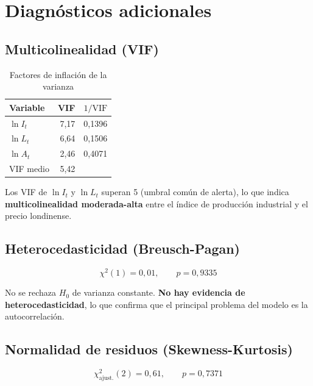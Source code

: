 \documentclass[12pt,a4paper]{article}
\begin{document}
\section*{Diagnósticos adicionales}

\subsection*{Multicolinealidad (VIF)}

\begin{table}[H]
  \centering
  \caption{Factores de inflación de la varianza}
  \label{tab:vif}
  \begin{tabular}{lrr}
    \toprule
    Variable & VIF & $1/\text{VIF}$ \\
    \midrule
    $\ln I_t$ & 7{,}17 & 0{,}1396 \\
    $\ln L_t$ & 6{,}64 & 0{,}1506 \\
    $\ln A_t$ & 2{,}46 & 0{,}4071 \\
    \midrule
    VIF medio & 5{,}42 & \\
    \bottomrule
  \end{tabular}
\end{table}

Los VIF de $\ln I_t$ y $\ln L_t$ superan 5 (umbral común de alerta),
lo que indica \textbf{multicolinealidad moderada-alta} entre el índice de
producción industrial y el precio londinense.

\subsection*{Heterocedasticidad (Breusch-Pagan)}

\[
  \chi^2(1) = 0{,}01, \qquad p = 0{,}9335
\]

No se rechaza $H_0$ de varianza constante. \textbf{No hay evidencia de
heterocedasticidad}, lo que confirma que el principal problema del modelo
es la autocorrelación.

\subsection*{Normalidad de residuos (Skewness-Kurtosis)}

\[
  \chi^2_{\text{ajust.}}(2) = 0{,}61, \qquad p = 0{,}7371
\]
\end{document}

